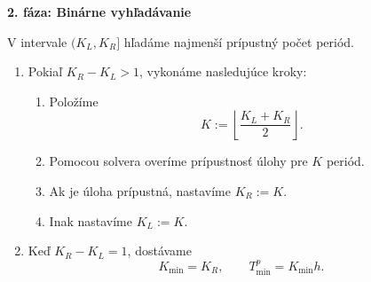 \documentclass[12pt,a4paper]{article}
\begin{document}
\textbf{2. fáza: Binárne vyhľadávanie}

V intervale $(K_L,K_R]$ hľadáme najmenší
prípustný počet periód.

\begin{enumerate}[label=\arabic*.]
  \item Pokiaľ $K_R-K_L>1$, vykonáme
  nasledujúce kroky:

  \begin{enumerate}[label=\arabic*.]
    \item Položíme
    \[
    K:=\left\lfloor\frac{K_L+K_R}{2}\right\rfloor.
    \]

    \item Pomocou solvera overíme prípustnosť
    úlohy pre $K$ periód.

    \item Ak je úloha prípustná, nastavíme
    $K_R:=K$.

    \item Inak nastavíme $K_L:=K$.
  \end{enumerate}

  \item Keď $K_R-K_L=1$, dostávame
  \[
  K_{\min}=K_R,\qquad
  T_{\min}^{p}=K_{\min}h.
  \]
\end{enumerate}
\end{document}
